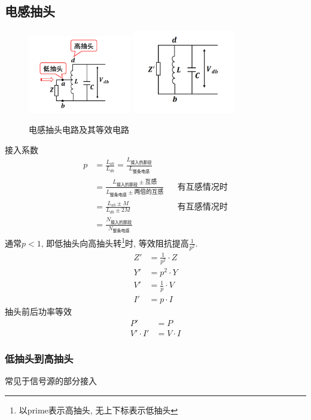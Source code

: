 \documentclass[a4paper]{report}
\begin{document}
\subsection{电感抽头}
\begin{figure}[H]
\centering
\includegraphics[width=0.4\textwidth]{tap_l.png}
\includegraphics[width=0.4\textwidth]{tap_l_equ.png}
\caption{电感抽头电路及其等效电路}
\end{figure}
接入系数
\begin{align*}
  p&=\frac{L_{ab}}{L_{db}}=\frac{ L_{\text{接入的那段}} }{ L_\text{整条电感} }\\
   &=\frac{ L_{\text{接入的那段}}\pm \text{互感} }{ L_\text{整条电感}\pm \text{两倍的互感} }&&有互感情况时\\
   &=\frac{L_{ab}\pm M}{L_{db}\pm 2M}&&有互感情况时\\
   &=\frac{N_{\text{接入的那段}}}{N_{\text{整条电感}}}
\end{align*}
通常$p<1$, 即低抽头向高抽头转\footnote{以prime表示高抽头, 无上下标表示低抽头}时, 等效阻抗提高$\frac{1}{p^2}$. 
\begin{align*}
  Z'&=\frac{1}{p^2}\cdot Z\\
  Y'&=p^2\cdot Y\\
  V'&=\frac{1}{p}\cdot V\\
  I'&=p\cdot I
\end{align*}
抽头前后功率等效
\begin{align*}
  P'&=P\\
  V'\cdot I'&=V\cdot I
\end{align*}
\subsubsection{低抽头到高抽头}
常见于信号源的部分接入
\end{document}
